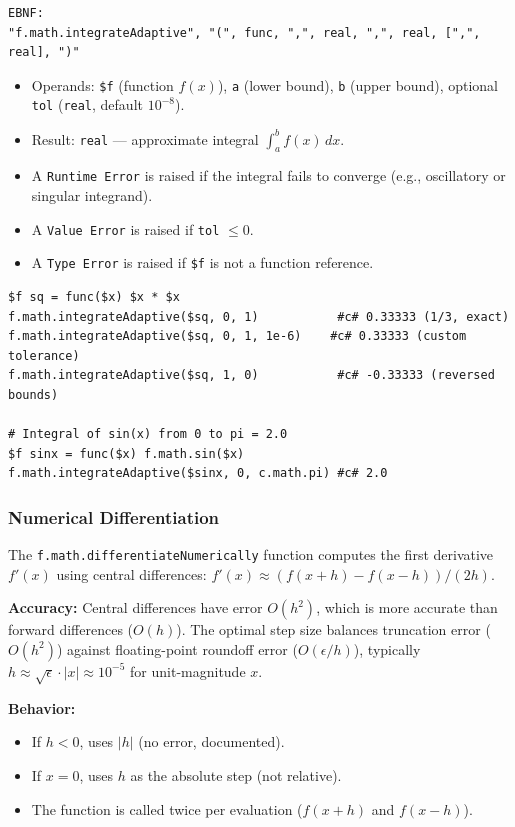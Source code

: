 \begin{verbatim}
EBNF:
"f.math.integrateAdaptive", "(", func, ",", real, ",", real, [",", real], ")"
\end{verbatim}
\begin{itemize}
\item Operands: \texttt{\$f} (function $f(x)$), \texttt{a} (lower bound), \texttt{b} (upper bound), optional \texttt{tol} (\texttt{real}, default $10^{-8}$).
\item Result: \texttt{real} --- approximate integral $\int_a^b f(x)\,dx$.
\item A \texttt{Runtime Error} is raised if the integral fails to converge (e.g., oscillatory or singular integrand).
\item A \texttt{Value Error} is raised if \texttt{tol} $\leq 0$.
\item A \texttt{Type Error} is raised if \texttt{\$f} is not a function reference.
\end{itemize}

\begin{verbatim}
$f sq = func($x) $x * $x
f.math.integrateAdaptive($sq, 0, 1)           #c# 0.33333 (1/3, exact)
f.math.integrateAdaptive($sq, 0, 1, 1e-6)    #c# 0.33333 (custom tolerance)
f.math.integrateAdaptive($sq, 1, 0)           #c# -0.33333 (reversed bounds)

# Integral of sin(x) from 0 to pi = 2.0
$f sinx = func($x) f.math.sin($x)
f.math.integrateAdaptive($sinx, 0, c.math.pi) #c# 2.0
\end{verbatim}

\subsubsection{Numerical Differentiation}
The \texttt{f.math.differentiateNumerically} function computes the first derivative $f'(x)$ using central differences: $f'(x) \approx (f(x+h) - f(x-h)) / (2h)$.

\textbf{Accuracy:} Central differences have error $O(h^2)$, which is more accurate than forward differences ($O(h)$). The optimal step size balances truncation error ($O(h^2)$) against floating-point roundoff error ($O(\epsilon/h)$), typically $h \approx \sqrt{\epsilon} \cdot |x| \approx 10^{-5}$ for unit-magnitude $x$.

\textbf{Behavior:}
\begin{itemize}
\item If $h < 0$, uses $|h|$ (no error, documented).
\item If $x = 0$, uses $h$ as the absolute step (not relative).
\item The function is called twice per evaluation ($f(x+h)$ and $f(x-h)$).
\end{itemize}

